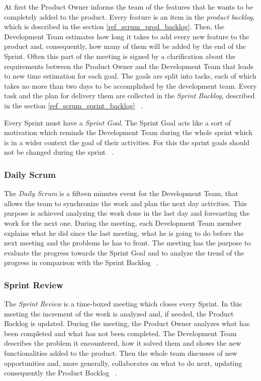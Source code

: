 			At first the Product Owner informs the team of the features that he wants to be completely added to the product. Every feature is an item in the \emph{product backlog}, which is described in the section \ref{ref_scrum_prod_backlog}. Then, the Development Team estimates how long it takes to add every new feature to the product and, consequently, how many of them will be added by the end of the Sprint. Often this part of the meeting is signed by a clarification about the requirements between the Product Owner and the Development Team that leads to new time estimation for each goal. The goals are split into tasks, each of which takes no more than two days to be accomplished by the development team. Every task and the plan for delivery them are collected in the \emph{Sprint Backlog}, described in the section \ref{ref_scrum_sprint_backlog} ~\cite{scrumEnglishGuide}.

			Every Sprint must have a \emph{Sprint Goal}. The Sprint Goal acts like a sort of motivation which reminds the Development Team during the whole sprint which is in a wider context the goal of their activities. For this the sprint goals should not be changed during the sprint ~\cite{scrumEnglishGuide}.
		
			\subsubsection{Daily Scrum}\label{ref_scrum_daily}
			The \emph{Daily Scrum} is a fifteen minutes event for the Development Team, that allows the team to synchronize the work and plan the next day activities. This purpose is achieved analyzing the work done in the last day and forecasting the work for the next one. 
			During the meeting, each Development Team member explains what he did since the last meeting, what he is going to do before the next meeting and the problems he has to front.
			The meeting has the purpose to evaluate the progress towards the Sprint Goal and to analyze the trend of the progress in comparison with the Sprint Backlog ~\cite{scrumEnglishGuide}. 

			\subsubsection{Sprint Review}\label{ref_scrum_sprint_rev}
			The \emph{Sprint Review} is a time-boxed meeting which closes every Sprint. In this meeting the increment of the work is analyzed and, if needed, the Product Backlog is updated. 
			During the meeting, the Product Owner analyzes what has been completed and what has not been completed. The Development Team describes the problem it encountered, how it solved them and shows the new functionalities added to the product. Then the whole team discusses of new opportunities and, more generally, collaborates on what to do next, updating consequently the Product Backlog ~\cite{scrumEnglishGuide}.			


